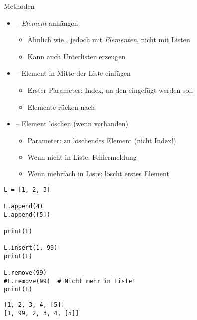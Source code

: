 
\begin{frame}[fragile]
%
\begin{minipage}{.49\linewidth}
\begin{Large}
Methoden
\vspace{6pt}
\end{Large}
\begin{itemize}
\item {} -- \emph{Element} anhängen
	\begin{itemize}
	\item Ähnlich wie \inPy{+=}, jedoch mit \emph{Elementen}, nicht mit Listen
	\item Kann auch Unterlisten erzeugen
	\end{itemize}
\item {} -- Element in Mitte der Liste einfügen
	\begin{itemize}
	\item Erster Parameter: Index, an den eingefügt werden soll
	\item Elemente rücken nach
	\end{itemize}
\item {} -- Element löschen (wenn vorhanden)
	\begin{itemize}
	\item Parameter: zu löschendes Element (nicht Index!)
	\item Wenn nicht in Liste: Fehlermeldung
	\item Wenn mehrfach in Liste: löscht erstes Element
	\end{itemize}
\end{itemize}
\end{minipage}
%
\begin{minipage}{.49\linewidth}
\phantom{x}
\begin{codebox}[Beispiel: \texttt{is} vs. \texttt{==}]
\begin{verbatim}
L = [1, 2, 3]

L.append(4)
L.append([5])

print(L)

L.insert(1, 99)
print(L)

L.remove(99)
#L.remove(99)  # Nicht mehr in Liste!
print(L)
\end{verbatim}
\end{codebox}
%
\begin{cmdbox}[Ausgabe]
\begin{verbatim}
[1, 2, 3, 4, [5]]
[1, 99, 2, 3, 4, [5]]
\end{verbatim}
\end{cmdbox}
\end{minipage}
%
\end{frame}

